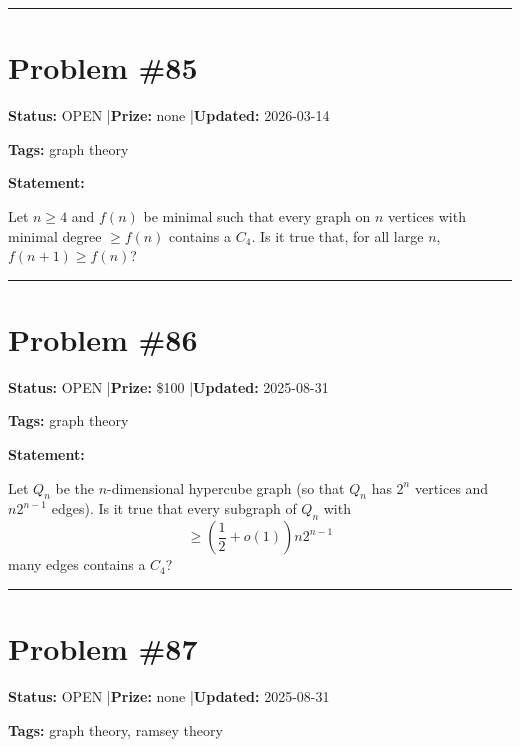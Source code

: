 \documentclass{article}
\begin{document}
\noindent\rule{\linewidth}{0.4pt}


\section{Problem \#85}
\label{prob:85}

\noindent\textbf{Status:} OPEN \quad|\quad \textbf{Prize:} none \quad|\quad \textbf{Updated:} 2026-03-14

\noindent\textbf{Tags:} graph theory

\medskip

\noindent\textbf{Statement:}

Let $n\geq 4$ and $f(n)$ be minimal such that every graph on $n$ vertices with minimal degree $\geq f(n)$ contains a $C_4$. Is it true that, for all large $n$, $f(n+1)\geq f(n)$?

\noindent\rule{\linewidth}{0.4pt}


\section{Problem \#86}
\label{prob:86}

\noindent\textbf{Status:} OPEN \quad|\quad \textbf{Prize:} \$100 \quad|\quad \textbf{Updated:} 2025-08-31

\noindent\textbf{Tags:} graph theory

\medskip

\noindent\textbf{Statement:}

Let $Q_n$ be the $n$-dimensional hypercube graph (so that $Q_n$ has $2^n$ vertices and $n2^{n-1}$ edges). Is it true that every subgraph of $Q_n$ with\[\geq \left(\frac{1}{2}+o(1)\right)n2^{n-1}\]many edges contains a $C_4$?

\noindent\rule{\linewidth}{0.4pt}


\section{Problem \#87}
\label{prob:87}

\noindent\textbf{Status:} OPEN \quad|\quad \textbf{Prize:} none \quad|\quad \textbf{Updated:} 2025-08-31

\noindent\textbf{Tags:} graph theory, ramsey theory

\medskip
\end{document}
